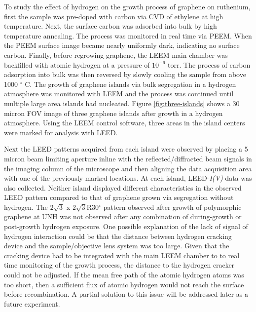  To study the effect of hydrogen on the growth process of graphene on ruthenium, first the sample was pre-doped with carbon via CVD of ethylene at high temperature. Next, the surface carbon was adsorbed into bulk by high temperature annealing. The process was monitored in real time via PEEM. When the PEEM surface image became nearly uniformly dark, indicating no surface carbon. Finally, before regrowing graphene, the LEEM main chamber was backfilled with atomic hydrogen at a pressure of $10^{-6}$ torr. The process of carbon adsorption into bulk was then reversed by slowly cooling the sample from above 1000 $^\circ$ C. The growth of graphene islands via bulk segregation in a hydrogen atmosphere was monitored with LEEM and the process was continued until multiple large area islands had nucleated. Figure \ref{fig:three-islands} shows a 30 micron FOV image of three graphene islands after growth in a hydrogen atmosphere. Using the LEEM control software, three areas in the island centers were marked for analysis with LEED.

 Next the LEED patterns acquired from each island were observed by placing a 5 micron beam limiting aperture inline with the reflected/diffracted beam signals in the imaging column of the microscope and then aligning the data acquisition area with one of the previously marked locations. At each island, LEED-\textit{I(V)} data was also collected. Neither island displayed different characteristics in the observed LEED pattern compared to that of graphene grown via segregation without hydrogen. The $2\sqrt{3}$ x $2\sqrt{3}$R30$^\circ$ pattern observed after growth of polymorphic graphene at UNH was not observed after any combination of during-growth or post-growth hydrogen exposure. One possible explanation of the lack of signal of hydrogen interaction could be that the distance between hydrogen cracking device and the sample/objective lens system was too large. Given that the cracking device had to be integrated with the main LEEM chamber to to real time monitoring of the growth process, the distance to the hydrogen cracker could not be adjusted. If the mean free path of the atomic hydrogen atoms was too short, then a sufficient flux of atomic hydrogen would not reach the surface before recombination. A partial solution to this issue will be addressed later as a future experiment.

